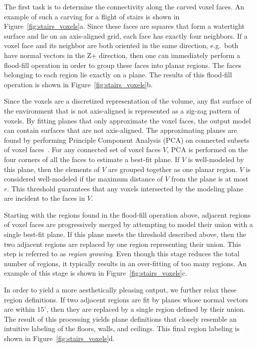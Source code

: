\documentclass[12pt,onecolumn,oneside]{book}
\begin{document}
The first task is to determine the connectivity along the carved voxel faces. An example of such a carving for a flight of stairs is shown in Figure~\ref{fig:stairs_voxels}a.  Since these faces are squares that form a watertight surface and lie on an axis-aligned grid, each face has exactly four neighbors.  If a voxel face and its neighbor are both oriented in the same direction, e.g.\ both have normal vectors in the Z+ direction, then one can immediately perform a flood-fill operation in order to group these faces into planar regions.  The faces belonging to each region lie exactly on a plane.  The results of this flood-fill operation is shown in Figure~\ref{fig:stairs_voxels}b.

Since the voxels are a discretized representation of the volume, any flat surface of the environment that is not axis-aligned is represented as a zig-zag pattern of voxels.  By fitting planes that only approximate the voxel faces, the output model can contain surfaces that are not axis-aligned.  The approximating planes are found by performing Principle Component Analysis (PCA) on connected subsets of voxel faces~\cite{PCA}.  For any connected set of voxel faces $V$, PCA is performed on the four corners of all the faces to estimate a best-fit plane.  If $V$ is well-modeled by this plane, then the elements of $V$ are grouped together as one planar region.  $V$ is considered well-modeled if the maximum distance of $V$ from the plane is at most $r$.  This threshold guarantees that any voxels intersected by the modeling plane are incident to the faces in $V$.

Starting with the regions found in the flood-fill operation above, adjacent regions of voxel faces are progressively merged by attempting to model their union with a single best-fit plane.  If this plane meets the threshold described above, then the two adjacent regions are replaced by one region representing their union.  This step is referred to as {\it region growing}.  Even though this stage reduces the total number of regions, it typically results in an over-fitting of too many regions.  An example of this stage is shown in Figure~\ref{fig:stairs_voxels}c.

In order to yield a more aesthetically pleasing output, we further relax these region definitions.  If two adjacent regions are fit by planes whose normal vectors are within $15^{\circ}$, then they are replaced by a single region defined by their union.  The result of this processing yields plane definitions that closely resemble an intuitive labeling of the floors, walls, and ceilings.  This final region labeling is shown in Figure~\ref{fig:stairs_voxels}d. 
\end{document}

